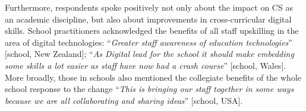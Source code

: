 \documentclass[conference]{IEEEtran}
\begin{document}


Furthermore, respondents spoke positively not only about the impact on
CS as an academic discipline, but also about improvements in
cross-curricular digital skills. School practitioners acknowledged the
benefits of all staff upskilling in the area of digital technologies:
``{\emph{Greater staff awareness of education technologies}}''
[school, New
Zealand]; ``{\emph{As Digital lead for the school it should make
embedding some skills a lot easier as staff have now had a crash
course}}'' [school, Wales]. More broadly, those in schools also mentioned the
collegiate benefits of the whole school response to the change
``{\emph{This is bringing our staff together in some ways because we
are all collaborating and sharing ideas}}'' [school, USA].


\end{document}

